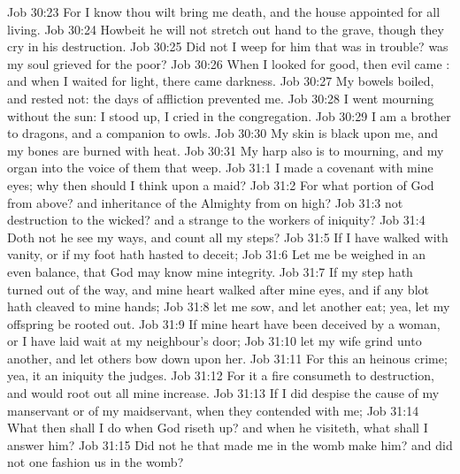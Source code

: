 \vs Job 30:23 For I know  thou wilt bring me  death, and  the house appointed for all living.
\vs Job 30:24 Howbeit he will not stretch out  hand to the grave, though they cry in his destruction.
\vs Job 30:25 Did not I weep for him that was in trouble? was  my soul grieved for the poor?
\vs Job 30:26 When I looked for good, then evil came : and when I waited for light, there came darkness.
\vs Job 30:27 My bowels boiled, and rested not: the days of affliction prevented me.
\vs Job 30:28 I went mourning without the sun: I stood up,  I cried in the congregation.
\vs Job 30:29 I am a brother to dragons, and a companion to owls.
\vs Job 30:30 My skin is black upon me, and my bones are burned with heat.
\vs Job 30:31 My harp also is  to mourning, and my organ into the voice of them that weep.
\vs Job 31:1 I made a covenant with mine eyes; why then should I think upon a maid?
\vs Job 31:2 For what portion of God  from above? and  inheritance of the Almighty from on high?
\vs Job 31:3  not destruction to the wicked? and a strange  to the workers of iniquity?
\vs Job 31:4 Doth not he see my ways, and count all my steps?
\vs Job 31:5 If I have walked with vanity, or if my foot hath hasted to deceit;
\vs Job 31:6 Let me be weighed in an even balance, that God may know mine integrity.
\vs Job 31:7 If my step hath turned out of the way, and mine heart walked after mine eyes, and if any blot hath cleaved to mine hands;
\vs Job 31:8  let me sow, and let another eat; yea, let my offspring be rooted out.
\vs Job 31:9 If mine heart have been deceived by a woman, or  I have laid wait at my neighbour's door;
\vs Job 31:10  let my wife grind unto another, and let others bow down upon her.
\vs Job 31:11 For this  an heinous crime; yea, it  an iniquity  the judges.
\vs Job 31:12 For it  a fire  consumeth to destruction, and would root out all mine increase.
\vs Job 31:13 If I did despise the cause of my manservant or of my maidservant, when they contended with me;
\vs Job 31:14 What then shall I do when God riseth up? and when he visiteth, what shall I answer him?
\vs Job 31:15 Did not he that made me in the womb make him? and did not one fashion us in the womb?
